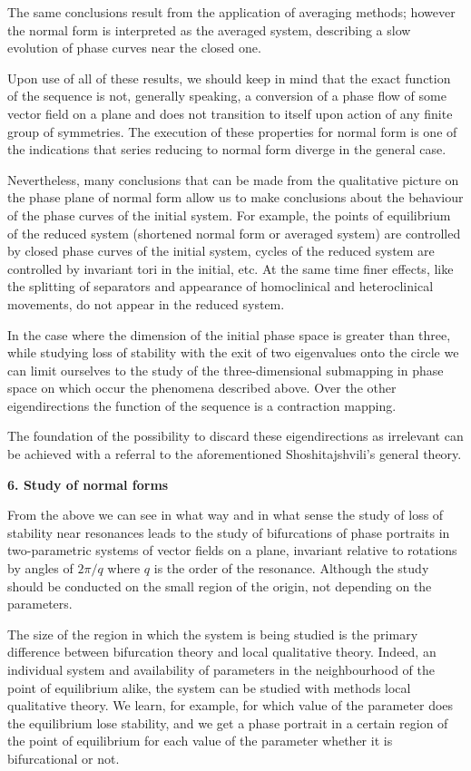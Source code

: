 \documentclass[12pt]{amsart}
\begin{document}
The same conclusions result from the application of averaging methods; however
the normal form is interpreted as the averaged system, describing a slow
evolution of phase curves near the closed one.

Upon use of all of these results, we should keep in mind that the exact function
of the sequence is not, generally speaking, a conversion of a phase flow of some
vector field on a plane and does not transition to itself upon action of any
finite group of symmetries.
The execution of these properties for normal form is one of the indications that
series reducing to normal form diverge in the general case.

Nevertheless, many conclusions that can be made from the qualitative picture on
the phase plane of normal form allow us to make conclusions about the behaviour
of the phase curves of the initial system.
For example, the points of equilibrium of the reduced system (shortened normal
form or averaged system) are controlled by closed phase curves of the initial
system, cycles of the reduced system are controlled by invariant tori in the
initial, etc.
At the same time finer effects, like the splitting of separators and appearance
of homoclinical and heteroclinical movements, do not appear in the reduced
system.

In the case where the dimension of the initial phase space is greater than
three, while studying loss of stability with the exit of two eigenvalues onto
the circle we can limit ourselves to the study of the three-dimensional
submapping in phase space on which occur the phenomena described above.
Over the other eigendirections the function of the sequence is a contraction
mapping.

The foundation of the possibility to discard these eigendirections as irrelevant
can be achieved with a referral to the aforementioned Shoshitajshvili's general
theory.\\

\centerline{\textbf{6. Study of normal forms}}
\vspace{1em}
From the above we can see in what way and in what sense the study of loss
of stability near resonances leads to the study of bifurcations of phase
portraits in two-parametric systems of vector fields on a plane, invariant
relative to rotations by angles of $2\pi/q$ where $q$ is the order of the
resonance.
Although the study should be conducted on the small region of the origin, not
depending on the parameters.

The size of the region in which the system is being studied is the primary
difference between bifurcation theory and local qualitative theory.
Indeed, an individual system and availability of parameters in the neighbourhood
of the point of equilibrium alike, the system can be studied with methods 
local qualitative theory.
We learn, for example, for which value of the parameter does the equilibrium
lose stability, and we get a phase portrait in a certain region of the point of
equilibrium for each value of the parameter whether it is bifurcational or not.
\end{document}
